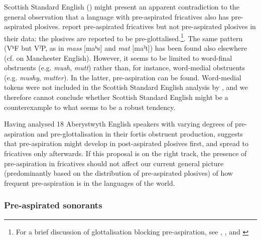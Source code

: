 \documentclass[output=paper]{langscibook}
\begin{document}
Scottish Standard English (\citealt{GordeevaScobbie2013}) might present an apparent contradiction to the general observation that a language with pre-aspirated fricatives also has pre-aspirated plosives. \citet[262]{GordeevaScobbie2013} report pre-aspirated fricatives but not pre-aspirated plosives in their data: the plosives are reported to be pre-glottalised.\footnote{For a brief discussion of glottalisation blocking pre-aspiration, see \citet[204]{HejnáKimper2019}, \citet{Hejná2021}, and \citet[216--217]{HejnáEtAl2021}}. The same pattern (VʰF but VˀP, as in \textit{mass} [maʰs] and \textit{mat} [maˀt]) has been found also elsewhere (cf. \citealt{HejnáScanlon2015} on Manchester English). However, it seems to be limited to word-final obstruents (e.g. \textit{mush}, \textit{mutt}) rather than, for instance, word-medial obstruents (e.g. \textit{mushy}, \textit{mutter}). In the latter, pre\hyp aspiration can be found. Word-medial tokens were not included in the Scottish Standard English analysis by \citet{GordeevaScobbie2013}, and we therefore cannot conclude whether Scottish Standard English might be a counterexample to what seems to be a robust tendency.

Having analysed 18 Aberystwyth English speakers with varying degrees of pre\hyp aspiration and pre-glottalisation in their fortis obstruent production, \citet[183]{Hejná2015} suggests that pre\hyp aspiration might develop in post-aspirated plosives first, and spread to fricatives only afterwards. If this proposal is on the right track, the presence of pre\hyp aspiration in fricatives should not affect our current general picture (predominantly based on the distribution of pre-aspirated plosives) of how frequent pre\hyp aspiration is in the languages of the world.

\subsubsection{Pre-aspirated sonorants}\label{sec:hejna:2.6.2}
\end{document}
